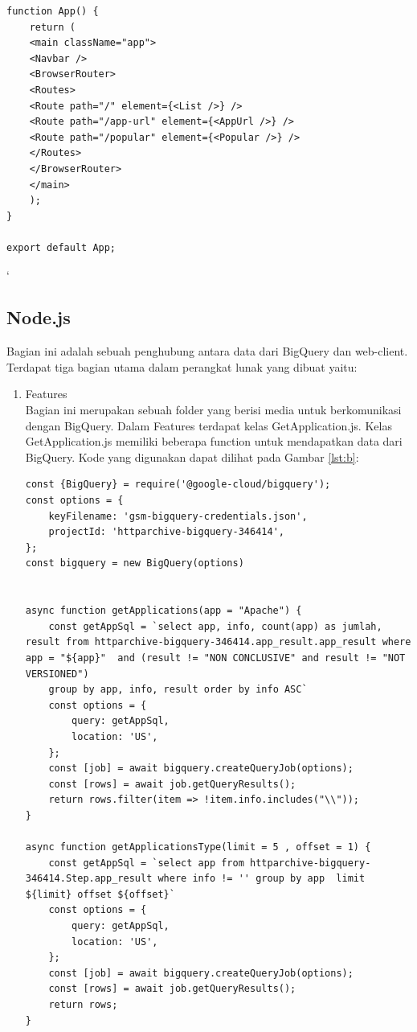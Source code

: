 \begin{itemize}
\begin{lstlisting}[label={lst:main}, caption={Komponen Utama}]
function App() {
	return (
	<main className="app">
	<Navbar />
	<BrowserRouter>
	<Routes>
	<Route path="/" element={<List />} />
	<Route path="/app-url" element={<AppUrl />} />
	<Route path="/popular" element={<Popular />} />
	</Routes>
	</BrowserRouter>
	</main>
	);
}

export default App;
	\end{lstlisting}
\end{itemize}

`\subsection{Node.js}
Bagian ini adalah sebuah penghubung antara data dari BigQuery dan web-client. Terdapat tiga bagian utama dalam perangkat lunak yang dibuat yaitu:
\begin{enumerate}
	\item Features\\
	Bagian ini merupakan sebuah folder yang berisi media untuk berkomunikasi dengan BigQuery. Dalam Features terdapat kelas GetApplication.js. Kelas GetApplication.js memiliki beberapa function untuk mendapatkan data dari BigQuery. Kode yang digunakan dapat dilihat pada Gambar \ref{lst:b}:
	\begin{lstlisting}[label={lst:b}, caption={Media untuk Komunikasi dengan BigQuery}]
const {BigQuery} = require('@google-cloud/bigquery');
const options = {
	keyFilename: 'gsm-bigquery-credentials.json',
	projectId: 'httparchive-bigquery-346414',
};
const bigquery = new BigQuery(options)


async function getApplications(app = "Apache") {
	const getAppSql = `select app, info, count(app) as jumlah, result from httparchive-bigquery-346414.app_result.app_result where app = "${app}"  and (result != "NON CONCLUSIVE" and result != "NOT VERSIONED")
	group by app, info, result order by info ASC`
	const options = {
		query: getAppSql,
		location: 'US',
	};
	const [job] = await bigquery.createQueryJob(options);
	const [rows] = await job.getQueryResults();
	return rows.filter(item => !item.info.includes("\\"));
}

async function getApplicationsType(limit = 5 , offset = 1) {
	const getAppSql = `select app from httparchive-bigquery-346414.Step.app_result where info != '' group by app  limit ${limit} offset ${offset}`
	const options = {
		query: getAppSql,
		location: 'US',
	};
	const [job] = await bigquery.createQueryJob(options);
	const [rows] = await job.getQueryResults();
	return rows;
}


\end{lstlisting}
\end{enumerate}
